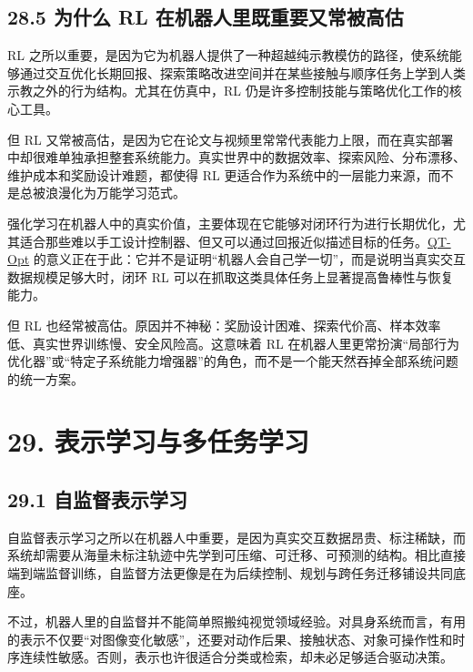 \section*{28.5 为什么 RL 在机器人里既重要又常被高估}


RL 之所以重要，是因为它为机器人提供了一种超越纯示教模仿的路径，使系统能够通过交互优化长期回报、探索策略改进空间并在某些接触与顺序任务上学到人类示教之外的行为结构。尤其在仿真中，RL 仍是许多控制技能与策略优化工作的核心工具。

但 RL 又常被高估，是因为它在论文与视频里常常代表能力上限，而在真实部署中却很难单独承担整套系统能力。真实世界中的数据效率、探索风险、分布漂移、维护成本和奖励设计难题，都使得 RL 更适合作为系统中的一层能力来源，而不是总被浪漫化为万能学习范式。

强化学习在机器人中的真实价值，主要体现在它能够对闭环行为进行长期优化，尤其适合那些难以手工设计控制器、但又可以通过回报近似描述目标的任务。\href{https://arxiv.org/abs/1806.10293}{QT-Opt} 的意义正在于此：它并不是证明“机器人会自己学一切”，而是说明当真实交互数据规模足够大时，闭环 RL 可以在抓取这类具体任务上显著提高鲁棒性与恢复能力。

但 RL 也经常被高估。原因并不神秘：奖励设计困难、探索代价高、样本效率低、真实世界训练慢、安全风险高。这意味着 RL 在机器人里更常扮演“局部行为优化器”或“特定子系统能力增强器”的角色，而不是一个能天然吞掉全部系统问题的统一方案。

\chapter*{29. 表示学习与多任务学习}

\section*{29.1 自监督表示学习}


自监督表示学习之所以在机器人中重要，是因为真实交互数据昂贵、标注稀缺，而系统却需要从海量未标注轨迹中先学到可压缩、可迁移、可预测的结构。相比直接端到端监督训练，自监督方法更像是在为后续控制、规划与跨任务迁移铺设共同底座。

不过，机器人里的自监督并不能简单照搬纯视觉领域经验。对具身系统而言，有用的表示不仅要“对图像变化敏感”，还要对动作后果、接触状态、对象可操作性和时序连续性敏感。否则，表示也许很适合分类或检索，却未必足够适合驱动决策。

